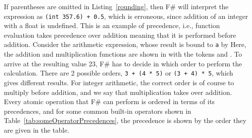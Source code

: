 If parentheses are omitted in Listing~\ref{rounding}, then F\# will interpret the expression as \lstinline|(int 357.6) + 0.5|, which is erroneous, since addition of an integer with a float is undefined. This is an example of precedence, i.e., function evaluation takes precedence over addition meaning that it is performed before addition. Consider the arithmetic expression, whose result is bound to \lstinline|a| by
%
Here, the addition and multiplication functions are shown in  with the  tokens \token{+} and \token{*}. To arrive at the resulting value 23, F\# has to decide in which order to perform the calculation. There are 2 possible orders, \lstinline|3 + (4 * 5)| or \lstinline|(3 + 4) * 5|, which gives different results. For integer arithmetic, the correct order is of course to multiply before addition, and we say that multiplication takes  over addition. Every atomic operation that F\# can perform is ordered in terms of its precedences, and for some common built-in operators shown in Table~\ref{tab:someOperatorPrecedences}, the precedence is shown by the order they are given in the table.
